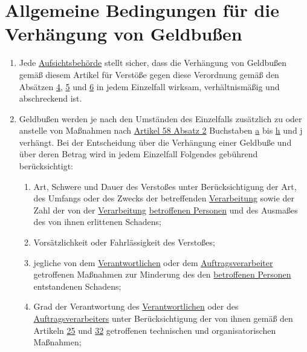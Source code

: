 \chapter{Allgemeine Bedingungen für die Verhängung von Geldbußen}
\label{ch:83}


\begin{enumerate}

  \item Jede \hyperref[itm:04-21]{Aufsichtsbehörde} stellt sicher, dass die Verhängung von Geldbußen gemäß diesem
   Artikel für Verstöße gegen diese Verordnung gemäß den Absätzen \hyperref[itm:83-4]{4}, \hyperref[itm:83-5]{5} und
   \hyperref[itm:83-6]{6} in jedem Einzelfall wirksam, verhältnismäßig und abschreckend ist.%
  \label{itm:83-1}

  \item Geldbußen werden je nach den Umständen des Einzelfalls zusätzlich zu oder anstelle von Maßnahmen nach \hyperref
   [itm:58-2]{Artikel 58 Absatz 2} Buchstaben \hyperref[itm:58-2a]{a} bis \hyperref[itm:58-2h]{h} und \hyperref
   [itm:58-2j]{j} verhängt. Bei der Entscheidung über die Verhängung einer Geldbuße und über deren Betrag wird in jedem
   Einzelfall Folgendes gebührend berücksichtigt:%
  \label{itm:83-2}

  \begin{enumerate}
  
    \item Art, Schwere und Dauer des Verstoßes unter Berücksichtigung der Art, des Umfangs oder des Zwecks der
     betreffenden \hyperref[itm:04-2]{Verarbeitung} sowie der Zahl der von der \hyperref[itm:04-2]
     {Verarbeitung} \hyperref[itm:04-1]{betroffenen Personen} und des Ausmaßes des von ihnen erlittenen Schadens;%
    \label{itm:83-2a}

    \item Vorsätzlichkeit oder Fahrlässigkeit des Verstoßes;%
    \label{itm:83-2b}

    \item jegliche von dem \hyperref[itm:04-7]{Verantwortlichen} oder dem \hyperref[itm:04-8]
     {Auftragsverarbeiter} getroffenen Maßnahmen zur Minderung des den
     \hyperref[itm:04-1]{betroffenen Personen} entstandenen Schadens;%
    \label{itm:83-2c}

    \item Grad der Verantwortung des \hyperref[itm:04-7]{Verantwortlichen} oder des \hyperref[itm:04-8]
     {Auftragsverarbeiters} unter Berücksichtigung der von ihnen gemäß den Artikeln \hyperref[ch:25]{25} und \hyperref
     [ch:32]{32} getroffenen technischen und organisatorischen Maßnahmen;%
    \label{itm:83-2d}


\end{enumerate}
\end{enumerate}
